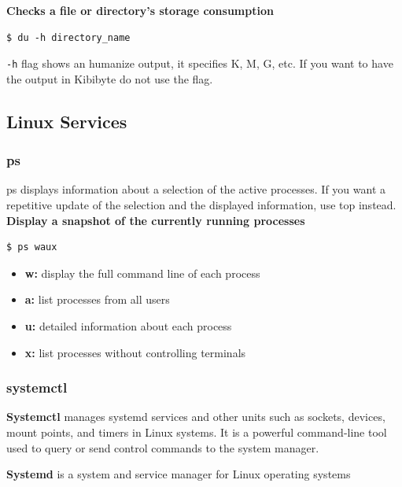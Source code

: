 \documentclass{article}
\newenvironment{blocktemplate}[1]{%
    \tcolorbox[beamer,%
    noparskip,breakable,
    colframe=Blue,%
    colbacklower=LimeGreen!75!LightGreen,%
    title=#1]}%
    {\endtcolorbox}
\newenvironment{codetemplate}[1][]{%
  \mybasecolorbox[#1]
  \itshape
}{%
  \endmybasecolorbox
}
\begin{document}
\textbf{Checks a file or directory’s storage consumption}
\begin{codetemplate}{}
\begin{verbatim}
$ du -h directory_name
\end{verbatim}
\end{codetemplate}

\begin{blocktemplate}{NOTE}
\verb|-h| flag shows an humanize output, it specifies K, M, G, etc. If you want to have the output in Kibibyte do not use the flag.
\end{blocktemplate}

\subsection{Linux Services}

\subsubsection{ps}
ps displays information about a selection of the active processes.  If you want a repetitive update of the selection and the displayed information, use top instead.
\textbf{Display a snapshot of the currently running processes}
\begin{codetemplate}{}
\begin{verbatim}
$ ps waux
\end{verbatim}
\end{codetemplate}
\begin{itemize}
    \item \textbf{w:} display the full command line of each process
    \item \textbf{a:} list processes from all users
    \item \textbf{u:} detailed information about each process
    \item \textbf{x:} list processes without controlling terminals
\end{itemize}

\subsubsection{systemctl}
\textbf{Systemctl} manages systemd services and other units such as sockets, devices, mount points, and timers in Linux systems. It is a powerful command-line tool used to query or send control commands to the system manager.

\textbf{Systemd} is a system and service manager for Linux operating systems
\end{document}
